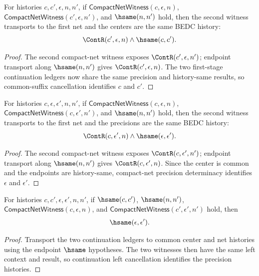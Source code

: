 
\begin{theorem}
\label{thm:compact-net-witness-common-precision-center-transport}
For histories $c,c',\epsilon,n,n'$, if
$\mathsf{CompactNetWitness}(c,\epsilon,n)$,
$\mathsf{CompactNetWitness}(c',\epsilon,n')$, and $\hsame(n,n')$ hold, then
the second witness transports to the first net and the centers are the same
BEDC history:
$$
\ContR(c',\epsilon,n)\land \hsame(c,c').
$$
\end{theorem}
\begin{proof}
The second compact-net witness exposes $\ContR(c',\epsilon,n')$; endpoint
transport along $\hsame(n,n')$ gives $\ContR(c',\epsilon,n)$. The two
first-stage continuation ledgers now share the same precision and history-same
results, so common-suffix cancellation identifies $c$ and $c'$.
\end{proof}

\begin{theorem}
\label{thm:compact-net-witness-common-center-precision-transport}
For histories $c,\epsilon,\epsilon',n,n'$, if
$\mathsf{CompactNetWitness}(c,\epsilon,n)$,
$\mathsf{CompactNetWitness}(c,\epsilon',n')$, and $\hsame(n,n')$ hold, then
the second witness transports to the first net and the precisions are the same
BEDC history:
$$
\ContR(c,\epsilon',n)\land \hsame(\epsilon,\epsilon').
$$
\end{theorem}
\begin{proof}
The second compact-net witness exposes $\ContR(c,\epsilon',n')$; endpoint
transport along $\hsame(n,n')$ gives $\ContR(c,\epsilon',n)$. Since the center
is common and the endpoints are history-same, compact-net precision
determinacy identifies $\epsilon$ and $\epsilon'$.
\end{proof}

\begin{theorem}
\label{thm:compact-net-witness-precision-hsame-deterministic}
For histories $c,c',\epsilon,\epsilon',n,n'$, if $\hsame(c,c')$,
$\hsame(n,n')$, $\mathsf{CompactNetWitness}(c,\epsilon,n)$, and
$\mathsf{CompactNetWitness}(c',\epsilon',n')$ hold, then
$$
\hsame(\epsilon,\epsilon').
$$
\end{theorem}
\begin{proof}
Transport the two continuation ledgers to common center and net histories using
the endpoint $\hsame$ hypotheses. The two witnesses then have the same left
context and result, so continuation left cancellation identifies the precision
histories.
\end{proof}

